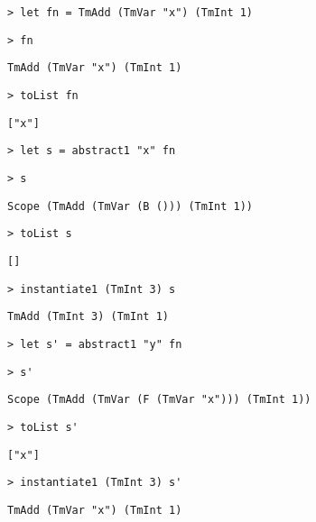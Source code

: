 \begin{frame}[fragile]
  \onslide<+->
  \begin{verbatim}
> let fn = TmAdd (TmVar "x") (TmInt 1)
  \end{verbatim}
  \onslide<+->
  \begin{verbatim}
> fn
  \end{verbatim}
  \onslide<+->
  \begin{verbatim}
TmAdd (TmVar "x") (TmInt 1)
  \end{verbatim}
  \onslide<+->
  \begin{verbatim}
> toList fn
  \end{verbatim}
  \onslide<+->
  \begin{verbatim}
["x"]
  \end{verbatim}
  \onslide<+->
  \begin{verbatim}
> let s = abstract1 "x" fn
  \end{verbatim}
  \onslide<+->
  \begin{verbatim}
> s
  \end{verbatim}
  \onslide<+->
  \begin{verbatim}
Scope (TmAdd (TmVar (B ())) (TmInt 1))
  \end{verbatim}
  \onslide<+->
  \begin{verbatim}
> toList s
  \end{verbatim}
  \onslide<+->
  \begin{verbatim}
[]
  \end{verbatim}
  \onslide<+->
  \begin{verbatim}
> instantiate1 (TmInt 3) s
  \end{verbatim}
  \onslide<+->
  \begin{verbatim}
TmAdd (TmInt 3) (TmInt 1)
  \end{verbatim}
\end{frame}

\begin{frame}[fragile]
  \onslide<+->
  \begin{verbatim}
> let s' = abstract1 "y" fn
  \end{verbatim}
  \onslide<+->
  \begin{verbatim}
> s'
  \end{verbatim}
  \onslide<+->
  \begin{verbatim}
Scope (TmAdd (TmVar (F (TmVar "x"))) (TmInt 1))
  \end{verbatim}
  \onslide<+->
  \begin{verbatim}
> toList s'
  \end{verbatim}
  \onslide<+->
  \begin{verbatim}
["x"]
  \end{verbatim}
  \onslide<+->
  \begin{verbatim}
> instantiate1 (TmInt 3) s'
  \end{verbatim}
  \onslide<+->
  \begin{verbatim}
TmAdd (TmVar "x") (TmInt 1)
  \end{verbatim}
\end{frame}

